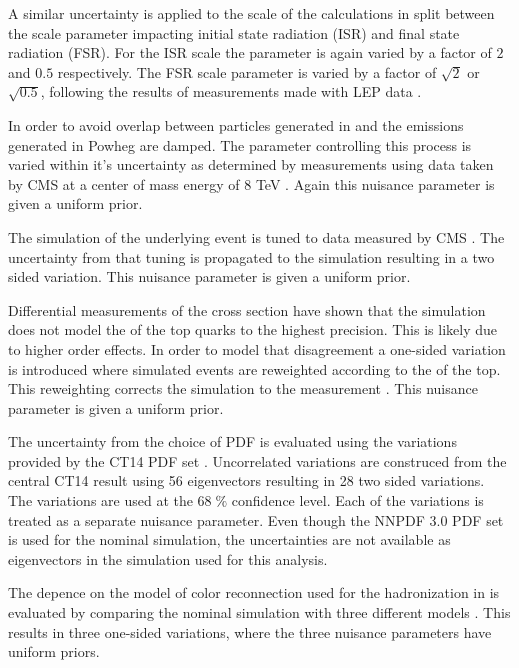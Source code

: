 A similar uncertainty is applied to the scale of the calculations in \PYTHIA split between the scale parameter impacting initial state radiation (ISR) and final state radiation (FSR). 
For the ISR scale the parameter is again varied by a factor of $2$ and $0.5$ respectively. The FSR scale parameter is varied by a factor of $\sqrt{2}$ or $\sqrt{0.5}$, following the results
of measurements made with LEP data \cite{Skands:2014pea}.

In order to avoid overlap between particles generated in \POWHEG and \PYTHIA the emissions generated in Powheg are damped. The parameter controlling this process is varied within it's uncertainty
as determined by measurements using data taken by CMS at a center of mass energy of 8 TeV \cite{CMS-PAS-TOP-16-021}.
Again this nuisance parameter is given a uniform prior.

The simulation of the underlying event is tuned to data measured by CMS \cite{CMS-PAS-TOP-16-021}. The uncertainty from that tuning is propagated to the simulation resulting in a two sided variation.
This nuisance parameter is given a uniform prior.

Differential measurements of the \ttbar cross section \cite{CMS-PAS-TOP-16-011} have shown that the simulation does not model the \pt of the top quarks to the highest precision.
This is likely due to higher order effects. In order to model that disagreement a one-sided variation is introduced where simulated events are reweighted according to the \pt of the top.
This reweighting corrects the simulation to the measurement \cite{CMS-PAS-TOP-16-011}. This nuisance parameter is given a uniform prior.

The uncertainty from the choice of PDF is evaluated using the variations provided by the CT14 PDF set \cite{Dulat:2015mca}. Uncorrelated variations are construced from the central CT14 result using 56 eigenvectors resulting in 28 two sided variations.
The variations are used at the $68 \;\%$ confidence level. Each of the variations is treated as a separate nuisance parameter.
Even though the NNPDF 3.0 PDF set is used for the nominal simulation, the uncertainties are not available as eigenvectors in the simulation used for this analysis.

The depence on the model of color reconnection used for the hadronization in \PYTHIA is evaluated by comparing the nominal simulation with three different models \cite{Argyropoulos:2014zoa,Christiansen:2015yqa}. This results in three one-sided variations, where the three nuisance parameters have uniform priors.

